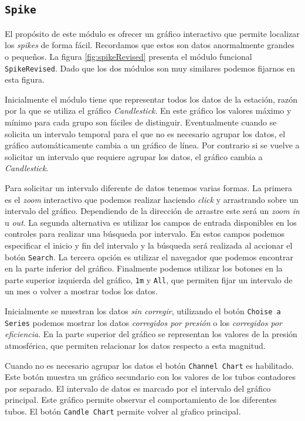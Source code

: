 	\subsection{\texttt{Spike}}
		El propósito de este módulo es ofrecer un gráfico interactivo que permite localizar los \emph{spikes} de forma fácil. Recordamos
		que estos son datos anormalmente grandes o pequeños. La figura \ref{fig:spikeRevised} presenta el módulo funcional
		\texttt{SpikeRevised}. Dado que los dos módulos son muy similares podemos fijarnos en esta figura.
		\par
		Inicialmente el módulo tiene que representar todos los datos de la estación, razón por la que se utiliza el gráfico
		\emph{Candlestick}. En este gráfico los valores máximo y mínimo para cada grupo son fáciles de distinguir. Eventualmente cuando se
		solicita  un intervalo temporal para el que no es necesario agrupar los datos, el gráfico automáticamente cambia a un gráfico de
		línea. Por contrario si se vuelve a solicitar un intervalo que requiere agrupar los datos, el gráfico cambia a \emph{Candlestick}.
		\par
		Para solicitar un intervalo diferente de datos tenemos varias formas. La primera es el \emph{zoom} interactivo que podemos realizar
		haciendo \emph{click} y arrastrando sobre un intervalo del gráfico. Dependiendo de la dirección de arrastre este será un \emph{zoom
		in} u \emph{out}. La segunda alternativa es utilizar los campos de entrada disponibles en los controles para realizar una búsqueda por
		intervalo.  En estos campos podemos especificar el inicio y fin del intervalo y la búsqueda será realizada al accionar el botón
		\texttt{Search}. La tercera opción es utilizar el navegador que podemos encontrar en la parte inferior del gráfico. Finalmente podemos
		utilizar los botones en la parte superior izquierda del gráfico, \texttt{1m} y \texttt{All}, que permiten fijar un intervalo de un mes
		o volver a mostrar todos los datos.
		\par
		Inicialmente se muestran los datos \emph{sin corregir}, utilizando el botón \texttt{Choise a Series} podemos mostrar los datos
		\emph{corregidos por presión} o los \emph{corregidos por eficiencia}. En la parte superior del gráfico se representan los valores
		de la presión atmosférica, que permiten relacionar los datos respecto a esta magnitud.
		\par
		Cuando no es necesario agrupar los datos el botón \texttt{Channel Chart} es habilitado. Este botón muestra un gráfico secundario con
		los valores de los tubos contadores por separado. El intervalo de datos es marcado por el intervalo del gráfico principal. Este
		gráfico permite observar el comportamiento de los diferentes tubos. El botón \texttt{Candle Chart} permite volver al gŕafico
		principal.

